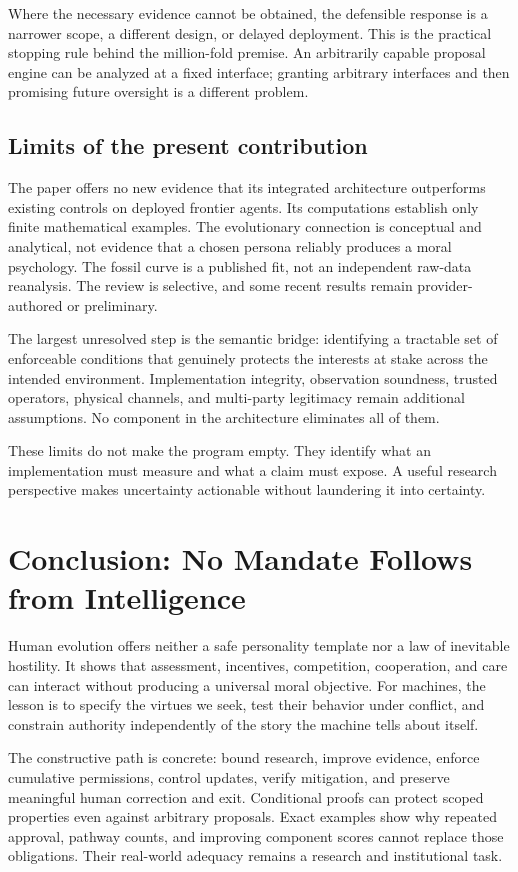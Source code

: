 \documentclass[10pt,twocolumn,letterpaper]{article}
\begin{document}
Where the necessary evidence cannot be obtained, the defensible response is a narrower scope, a different design, or delayed deployment. This is the practical stopping rule behind the million-fold premise. An arbitrarily capable proposal engine can be analyzed at a fixed interface; granting arbitrary interfaces and then promising future oversight is a different problem.

\subsection{Limits of the present contribution}
The paper offers no new evidence that its integrated architecture outperforms existing controls on deployed frontier agents. Its computations establish only finite mathematical examples. The evolutionary connection is conceptual and analytical, not evidence that a chosen persona reliably produces a moral psychology. The fossil curve is a published fit, not an independent raw-data reanalysis. The review is selective, and some recent results remain provider-authored or preliminary.

The largest unresolved step is the semantic bridge: identifying a tractable set of enforceable conditions that genuinely protects the interests at stake across the intended environment. Implementation integrity, observation soundness, trusted operators, physical channels, and multi-party legitimacy remain additional assumptions. No component in the architecture eliminates all of them.

These limits do not make the program empty. They identify what an implementation must measure and what a claim must expose. A useful research perspective makes uncertainty actionable without laundering it into certainty.

\section{Conclusion: No Mandate Follows from Intelligence}
Human evolution offers neither a safe personality template nor a law of inevitable hostility. It shows that assessment, incentives, competition, cooperation, and care can interact without producing a universal moral objective. For machines, the lesson is to specify the virtues we seek, test their behavior under conflict, and constrain authority independently of the story the machine tells about itself.

The constructive path is concrete: bound research, improve evidence, enforce cumulative permissions, control updates, verify mitigation, and preserve meaningful human correction and exit. Conditional proofs can protect scoped properties even against arbitrary proposals. Exact examples show why repeated approval, pathway counts, and improving component scores cannot replace those obligations. Their real-world adequacy remains a research and institutional task.
\end{document}
